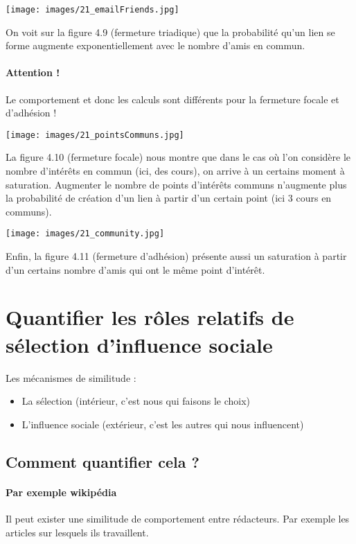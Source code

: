\texttt{[image: images/21\_emailFriends.jpg]}

On voit sur la figure 4.9 (fermeture triadique) que la probabilité qu'un lien se forme augmente exponentiellement avec le nombre d'amis en commun.

\paragraph{Attention !}
Le comportement et donc les calculs sont différents pour la fermeture focale et d'adhésion !

\texttt{[image: images/21\_pointsCommuns.jpg]}

La figure 4.10 (fermeture focale) nous montre que dans le cas où l'on considère le nombre d'intérêts en commun (ici, des cours), on arrive à un certains moment à saturation. Augmenter le nombre de points d'intérêts communs n'augmente plus la probabilité de création d'un lien à partir d'un certain point (ici 3 cours en communs).

\texttt{[image: images/21\_community.jpg]}

Enfin, la figure 4.11 (fermeture d'adhésion) présente aussi un saturation à partir d'un certains nombre d'amis qui ont le même point d'intérêt.

\section{Quantifier les rôles relatifs de sélection d'influence sociale}
Les mécanismes de similitude :
\begin{itemize}
\item La sélection (intérieur, c'est nous qui faisons le choix)
\item L'influence sociale (extérieur, c'est les autres qui nous influencent) 
\end{itemize}
\subsection{Comment quantifier cela ?}
\paragraph*{Par exemple wikipédia}
Il peut exister une similitude de comportement entre rédacteurs. Par exemple les articles sur lesquels ils travaillent.

